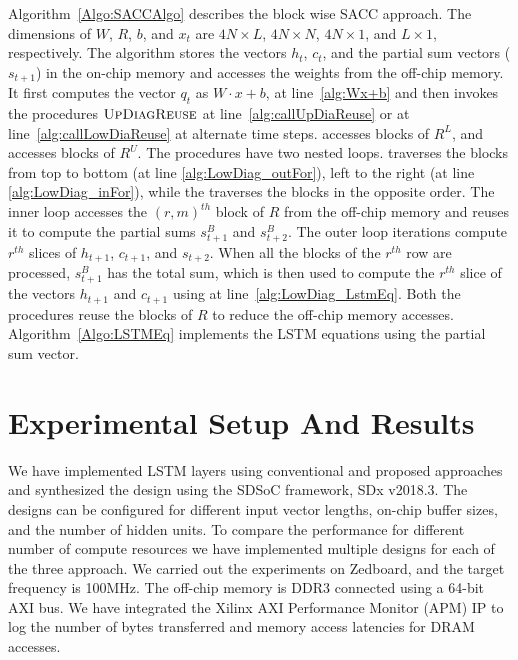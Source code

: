 Algorithm~\ref{Algo:SACCAlgo} describes the block wise SACC approach. The dimensions of $W$, $R$, $b$, and $x_t$ are $4N{\times}L$, $4N{\times}N$, $4N{\times}1$, and $L{\times}1$, respectively. The algorithm stores the vectors $h_t$, $c_t$, and the partial sum vectors ($s_{t+1}$) in the on-chip memory and accesses the weights from the off-chip memory. It first computes the vector $q_t$ as $W{\cdot}x{+}b$, at line~\ref{alg:Wx+b} and then invokes the procedures $\textproc{UpDiagReuse}$ at line~\ref{alg:callUpDiaReuse} or   at line~\ref{alg:callLowDiaReuse} at alternate time steps.  accesses blocks of $R^L$, and  accesses blocks of $R^U$. The procedures have two nested loops.  traverses the blocks from top to bottom (at line \ref{alg:LowDiag_outFor}), left to the right (at line \ref{alg:LowDiag_inFor}), while the  traverses the blocks in the opposite order. The inner loop accesses the $(r,m)^{th}$ block of $R$ from the off-chip memory and reuses it to compute the partial sums $s^B_{t+1}$ and $s^B_{t+2}$. The outer loop iterations compute $r^{th}$ slices of $h_{t+1}$, $c_{t+1}$, and $s_{t+2}$.
When all the blocks of the $r^{th}$ row are processed, $s^B_{t+1}$ has the total sum, which is then used to compute the $r^{th}$ slice of the vectors $h_{t+1}$ and $c_{t+1}$ using  at line~\ref{alg:LowDiag_LstmEq}. 
Both the procedures reuse the blocks of $R$ to reduce the off-chip memory accesses. Algorithm~\ref{Algo:LSTMEq} implements the LSTM equations using the partial sum vector.

\section{Experimental Setup And Results}
We have implemented LSTM layers using conventional and proposed approaches and synthesized the design using the SDSoC framework, SDx v2018.3. The designs can be configured for different input vector lengths, on-chip buffer sizes, and the number of hidden units. To compare the performance for different number of compute resources we have implemented multiple designs for each of the three approach. We carried out the experiments on Zedboard, and the target frequency is 100MHz.  The off-chip memory is DDR3 connected using a 64-bit AXI bus. We have integrated the Xilinx AXI Performance Monitor (APM) IP to log the number of bytes transferred and memory access latencies for DRAM accesses.

